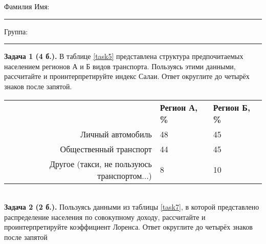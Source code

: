 \documentclass{article}
\begin{document}
\mbox{}

\vspace{-36pt}

\begin{center}
	\begin{tcolorbox}[colback=white, boxrule=0.20ex, sharp corners = all, height=25pt, colframe=black, valign=top]
		\begin{center}
			Фамилия Имя:\hspace{1.5pt}\rule{190pt}{0pt}\hspace{50pt}Группа:\hspace{1.5pt}\rule{60pt}{0pt}
		\end{center}
	\end{tcolorbox}
\end{center}
\vspace{3pt}

\textbf{Задача 1 (4 б.).} В таблице \ref{task5} представлена структура предпочитаемых населением регионов А и Б видов транспорта. Пользуясь этими данными, рассчитайте и проинтерпретируйте индекс Салаи. Ответ округлите до четырёх знаков после запятой.\\

\begin{minipage}{\textwidth}
\centering
\begin{tabularx}{0.7\textwidth}{rYY}
\toprule
 & \textbf{Регион А, \%} & \textbf{Регион Б, \%} \\
\cmidrule(lr){2-2}\cmidrule(lr){3-3}
Личный автомобиль & 48 & 45 \\

Общественный транспорт & 44 & 45 \\

Другое (такси, не пользуюсь транспортом...) & 8 & 10 \\
\bottomrule
\end{tabularx}
\label{task5}
\end{minipage} \\[35pt]

\textbf{Задача 2 (2 б.).} Пользуясь данными из таблицы \ref{task7}, в которой представлено распределение населения по совокупному доходу, рассчитайте и проинтерпретируйте коэффициент Лоренса. Ответ округлите до четырёх знаков после запятой\\
\end{document}
